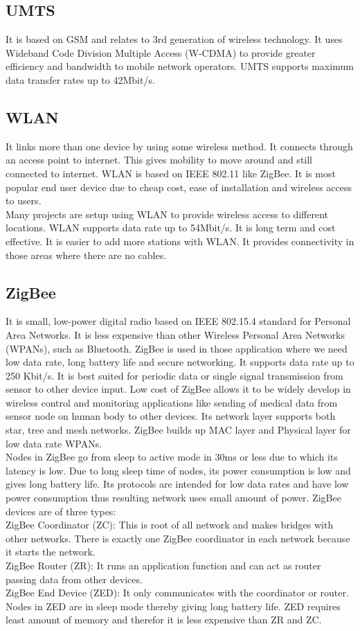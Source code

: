 \documentclass[11pt, conference, compsocconf, onecolumn]{IEEEtran}
\begin{document}
\subsection{UMTS}
It is based on GSM and relates to 3rd generation of wireless technology. It uses Wideband Code Division Multiple Access (W-CDMA) to provide greater efficiency and bandwidth to mobile network operators. UMTS supports maximum data transfer rates up to 42Mbit/s.
\subsection{WLAN}
It links more than one device by using some wireless method. It connects through an access point to internet. This gives mobility to move around and still connected to internet. WLAN is based on IEEE 802.11 like ZigBee. It is most popular end user device due to cheap cost, ease of installation and wireless access to users.
\\
\indent Many projects are setup using WLAN to provide wireless access to different locations. WLAN supports data rate up to 54Mbit/s. It is long term and cost effective. It is easier to add more stations with WLAN. It provides connectivity in those areas where there are no cables.
\subsection{ZigBee}
It is small, low-power digital radio based on IEEE 802.15.4 standard for Personal Area Networks. It is less expensive than other Wireless Personal Area Networks (WPANs), such as Bluetooth. ZigBee is used in those application where we need low data rate, long battery life and secure networking. It supports data rate up to 250 Kbit/s. It is best suited for periodic data or single signal transmission from sensor to other device input. Low cost of ZigBee allows it to be widely develop in wireless control and monitoring applications like sending of medical data from sensor node on human body to other devices. Its network layer supports both star, tree and mesh networks. ZigBee builds up MAC layer and Physical layer for low data rate WPANs.
\\
\indent Nodes in ZigBee go from sleep to active mode in 30ms or less due to which its latency is low. Due to long sleep time of nodes, its power consumption is low and gives long battery life. Its protocols are intended for low data rates and have low power consumption thus resulting network uses small amount of power. ZigBee devices are of three types:
\\
\indent ZigBee Coordinator (ZC): This is root of all network and makes bridges with other networks. There is exactly one ZigBee coordinator in each network because it starts the network.
\\
\indent ZigBee Router (ZR): It runs an application function and can act as router passing data from other devices.
\\
\indent ZigBee End Device (ZED): It only communicates with the coordinator or router. Nodes in ZED are in sleep mode thereby giving long battery life. ZED requires least amount of memory and therefor it is less expensive than ZR and ZC.
\end{document}

